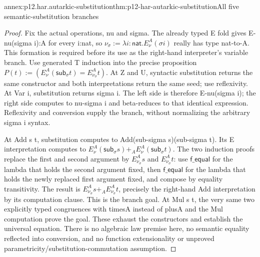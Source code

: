 \begin{annexitem}{annex:p12.har.autarkic-substitution}{thm:p12-har-autarkic-substitution}{All five semantic-substitution branches}
\begin{proof}
Fix the actual operations, nu and sigma. The already typed E fold
gives E-nu(sigma i):A for every i:nat, so
\(\nu_\sigma:=\lambda i:\mathsf{nat}.E_\nu^A(\sigma i)\)
really has type nat-to-A. This formation is required before its use
as the right-hand interpreter's variable branch.
Use generated T induction into the precise proposition
\(P(t):=(E_\nu^A(\mathsf{sub}_\sigma t)=E_{\nu_\sigma}^A t)\).
At Z and U, syntactic substitution returns the same constructor and
both interpretations return the same seed; use reflexivity.
At Var i, substitution returns sigma i. The left side is therefore
E-nu(sigma i); the right side computes to nu-sigma i and beta-reduces
to that identical expression. Reflexivity and conversion supply the
branch, without normalizing the arbitrary sigma i syntax.

At Add s t, substitution computes to
Add(sub-sigma s)(sub-sigma t). Its E interpretation computes to
\(E_\nu^A(\mathsf{sub}_\sigma s)+_A
E_\nu^A(\mathsf{sub}_\sigma t)\).
The two induction proofs replace the first and second argument by
\(E_{\nu_\sigma}^A s\) and \(E_{\nu_\sigma}^A t\): use \(\mathsf{f\_equal}\)
for the lambda that holds the second argument fixed, then \(\mathsf{f\_equal}\)
for the lambda that holds the newly replaced first argument fixed,
and compose by equality transitivity. The result is
\(E_{\nu_\sigma}^A s+_A E_{\nu_\sigma}^A t\), precisely the
right-hand Add interpretation by its computation clause. This is the
branch goal. At Mul s t, the very same two explicitly typed congruences
with timesA instead of plusA and the Mul computation prove the goal.
These exhaust the constructors and establish the universal equation.
There is no algebraic law premise here, no semantic equality reflected
into conversion, and no function extensionality or unproved
parametricity/substitution-commutation assumption.
\end{proof}
\end{annexitem}
